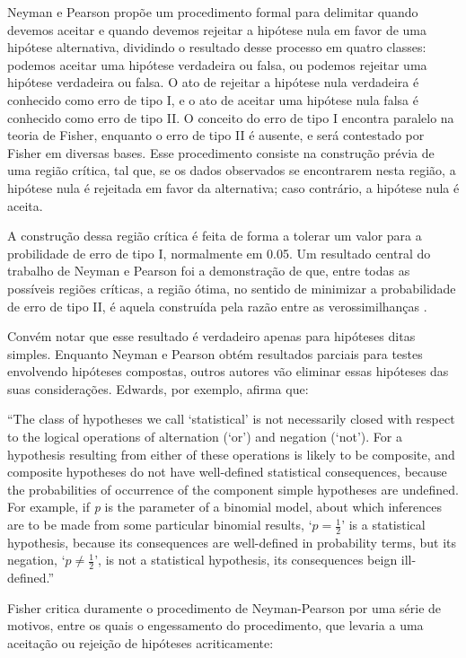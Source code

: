 Neyman e Pearson propõe um procedimento formal para delimitar quando devemos aceitar e quando devemos rejeitar a hipótese
nula em favor de uma hipótese alternativa, dividindo o resultado desse processo em quatro classes: podemos aceitar uma hipótese
verdadeira ou falsa, ou podemos rejeitar uma hipótese verdadeira ou falsa. O ato de rejeitar a hipótese nula verdadeira
é conhecido como erro de tipo I, e o ato de aceitar uma hipótese nula falsa é conhecido como erro de tipo II. O conceito do 
erro de tipo I encontra paralelo na teoria de Fisher, enquanto o erro de tipo II é ausente, e será contestado por Fisher em
diversas bases. Esse procedimento consiste na construção prévia de uma região crítica, tal que, se os dados observados se
encontrarem nesta região, a hipótese nula é rejeitada em favor da alternativa; caso contrário, a hipótese nula é aceita.

A construção dessa região crítica é feita de forma a tolerar um valor para a probilidade de erro de tipo I, normalmente em
0.05. Um resultado central do trabalho de Neyman e Pearson foi a demonstração de que, entre todas as possíveis regiões críticas,
a região ótima, no sentido de minimizar a probabilidade de erro de tipo II, é aquela construída pela razão entre as 
verossimilhanças \citep{Neyman1933}. 

Convém notar que esse resultado é verdadeiro apenas para hipóteses ditas simples. Enquanto Neyman e Pearson obtém resultados
parciais para testes envolvendo hipóteses compostas, outros autores vão eliminar essas hipóteses das suas considerações.
Edwards, por exemplo, afirma que:

``The class of hypotheses we call `statistical' is not necessarily closed with respect to the logical operations of
alternation (`or') and negation (`not'). For a hypothesis resulting from either of these operations is likely to be composite,
and composite hypotheses do not have well-defined statistical consequences, because the probabilities of occurrence of the
component simple hypotheses are undefined. For example, if {\em p} is the parameter of a binomial model, about which inferences
are to be made from some particular binomial results, `$p = \frac{1}{2}$' is a statistical hypothesis, because its 
consequences are well-defined in probability terms, but its negation, `$p \neq \frac{1}{2}$', is not a statistical hypothesis,
its consequences beign ill-defined.''\citep{Edwards72}

Fisher critica duramente o procedimento de Neyman-Pearson por uma série de motivos, entre os quais o engessamento do procedimento,
que levaria a uma aceitação ou rejeição de hipóteses acriticamente:

